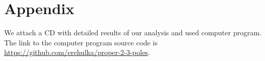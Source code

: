 \chapter*{Appendix}

We attach a CD with detailed results of our analysis and used computer program. The link to the computer program source code is \newline
\url{https://github.com/erehulka/proper-2-3-poles}.
